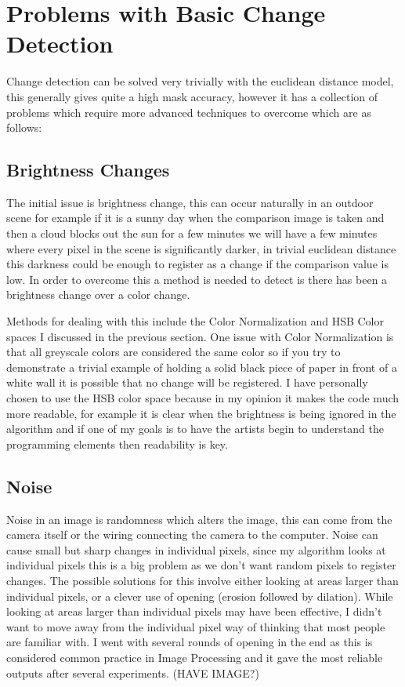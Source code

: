 \documentclass[a4paper]{report}
\begin{document}
\section{Problems with Basic Change Detection}
Change detection can be solved very trivially with the euclidean distance model, this generally gives quite a high mask accuracy, however it has a collection of problems which require more advanced techniques to overcome which are as follows:

\subsection{Brightness Changes}
The initial issue is brightness change, this can occur naturally in an outdoor scene for example if it is a sunny day when the comparison image is taken and then a cloud blocks out the sun for a few minutes we will have a few minutes where every pixel in the scene is significantly darker, in trivial euclidean distance this darkness could be enough to register as a change if the comparison value is low. In order to overcome this a method is needed to detect is there has been a brightness change over a color change.

Methods for dealing with this include the Color Normalization and HSB Color spaces I discussed in the previous section. One issue with Color Normalization is that all greyscale colors are considered the same color so if you try to demonstrate a trivial example of holding a solid black piece of paper in front of a white wall it is possible that no change will be registered. I have personally chosen to use the HSB color space because in my opinion it makes the code much more readable, for example it is clear when the brightness is being ignored in the algorithm and if one of my goals is to have the artists begin to understand the programming elements then readability is key.

\subsection{Noise}
Noise in an image is randomness which alters the image, this can come from the camera itself or the wiring connecting the camera to the computer. Noise can cause small but sharp changes in individual pixels, since my algorithm looks at individual pixels this is a big problem as we don't want random pixels to register changes. The possible solutions for this involve either looking at areas larger than individual pixels, or a clever use of opening (erosion followed by dilation). While looking at areas larger than individual pixels may have been effective, I didn't want to move away from the individual pixel way of thinking that most people are familiar with. I went with several rounds of opening in the end as this is considered common practice in Image Processing and it gave the most reliable outputs after several experiments. (HAVE IMAGE?)
\end{document}
